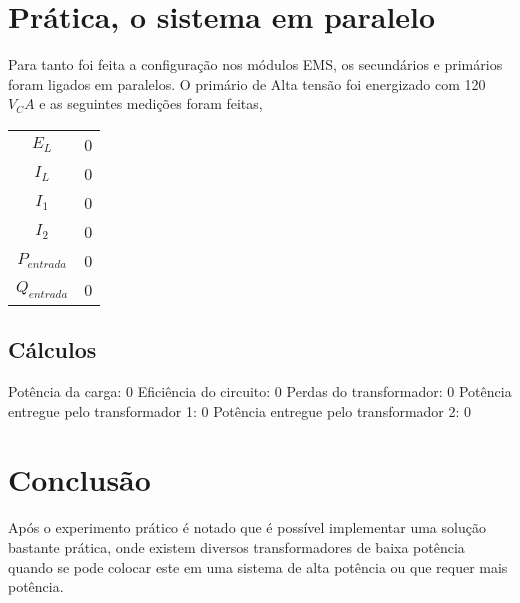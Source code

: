 \documentclass[paper=a4, fontsize=11pt]{article}
\begin{document}
\section{Prática, o sistema em paralelo}

Para tanto foi feita a configuração nos módulos EMS, os secundários e 
primários foram ligados em paralelos. O primário de Alta tensão foi energizado
com 120 $V_CA$ e as seguintes medições foram feitas,

\begin{center}
\begin{tabular}{c||c}
    $E_L$ & 0\\
    $I_L$ & 0\\
    $I_1$ & 0\\
    $I_2$ & 0\\
    $P_{entrada}$ & 0\\
    $Q_{entrada}$ & 0\\
\end{tabular}
\end{center}

\subsection{Cálculos}

Potência da carga: $0$
\newline
Eficiência do circuito: $0$
\newline
Perdas do transformador: $0$
\newline
Potência entregue pelo transformador 1: $0$
\newline
Potência entregue pelo transformador 2: $0$

\section{Conclusão}

Após o experimento prático é notado que é possível implementar uma solução bastante
prática, onde existem diversos transformadores de baixa potência quando se pode colocar
este em uma sistema de alta potência ou que requer mais potência.
\end{document}
